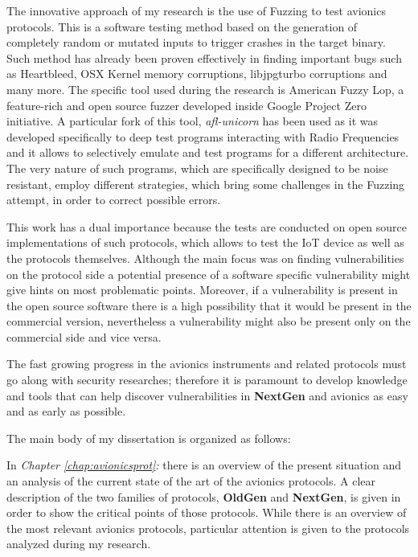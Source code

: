 \documentclass[../main.tex]{subfiles}
\begin{document}
The innovative approach of my research is the use of Fuzzing to test avionics protocols. This is a software testing method based on the generation of completely random or mutated inputs to trigger crashes in the target binary. Such method has already been proven effectively in finding important bugs such as Heartbleed, OSX Kernel memory corruptions, libjpgturbo corruptions and many more. The specific tool used during the research is American Fuzzy Lop, a feature-rich and open source fuzzer developed inside Google Project Zero initiative. A particular fork of this tool, \textit{afl-unicorn} has been used as it was developed specifically to deep test programs interacting with Radio Frequencies and it allows to selectively emulate and test programs for a different architecture.
The very nature of such programs, which are specifically designed to be noise resistant, employ different strategies, which bring some challenges in the Fuzzing attempt, in order to correct possible errors.

This work has a dual importance because the tests are conducted on open source implementations of such protocols, which allows to test the IoT device as well as the protocols themselves. Although the main focus was on finding vulnerabilities on the protocol side a potential presence of a software specific vulnerability might give hints on most problematic points. Moreover, if a vulnerability is present in the open source software there is a high possibility that it would be present in the commercial version, nevertheless a vulnerability might also be present only on the commercial side and vice versa.

The fast growing progress in the avionics instruments and related protocols must go along with security researches; therefore it is paramount to develop knowledge and tools that can help discover vulnerabilities in \textbf{NextGen} and avionics as easy and as early as possible.


\bigskip \noindent
The main body of my dissertation is organized as follows:

\bigskip \noindent
In \textit{Chapter \ref{chap:avionicsprot}: } there is an overview of the present situation and an analysis of the current state of the art of the avionics protocols. A clear description of the two families of protocols, \textbf{OldGen} and \textbf{NextGen}, is given in order to show the critical points of those protocols. While there is an overview of the most relevant avionics protocols, particular attention is given to the protocols analyzed during my research.
\end{document}
